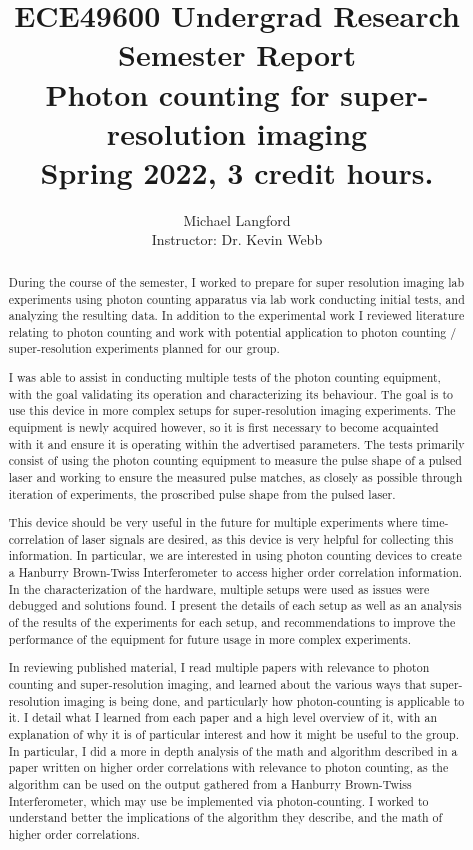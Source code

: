 \documentclass[a4paper]{article}
\title{ECE49600 Undergrad Research Semester Report \\
  \large Photon counting for super-resolution imaging \\
  \large Spring 2022, 3 credit hours.  }
\author{Michael Langford \newline \\
        Instructor: Dr. Kevin Webb}
\begin{document}
\maketitle

\begin{abstract}
During the course of the semester, I worked to prepare for super resolution imaging lab experiments using photon counting apparatus via lab work conducting initial tests, and analyzing the resulting data. In addition to the experimental work I reviewed literature relating to photon counting and work with potential application to photon counting / super-resolution experiments planned for our group.

I was able to assist in conducting multiple tests of the photon counting equipment, with the goal validating its operation and characterizing its behaviour. The goal is to use this device in more complex setups for super-resolution imaging experiments. The equipment is newly acquired however, so it is first necessary to become acquainted with it and ensure it is operating within the advertised parameters. 
The tests primarily consist of using the photon counting equipment to measure the pulse shape of a pulsed laser and working to ensure the measured pulse matches, as closely as possible through iteration of experiments, the proscribed pulse shape from the pulsed laser.

This device should be very useful in the future for multiple experiments where time-correlation of laser signals are desired, as this device is very helpful for collecting this information. In particular, we are interested in using photon counting devices to create a Hanburry Brown-Twiss Interferometer to access higher order correlation information. 
In the characterization of the hardware, multiple setups were used as issues were debugged and solutions found. I present the details of each setup as well as an analysis of the results of the experiments for each setup, and recommendations to improve the performance of the equipment for future usage in more complex experiments.

In reviewing published material, I read multiple papers with relevance to photon counting and super-resolution imaging, and learned about the various ways that super-resolution imaging is being done, and particularly how photon-counting is applicable to it. I detail what I learned from each paper and a high level overview of it, with an explanation of why it is of particular interest and how it might be useful to the group. 
In particular, I did a more in depth analysis of the math and algorithm described in a paper written on higher order correlations with relevance to photon counting, as the algorithm can be used on the output gathered from a Hanburry Brown-Twiss Interferometer, which may use be implemented via photon-counting. I worked to understand better the implications of the algorithm they describe, and the math of higher order correlations.

\end{abstract}
\end{document}
